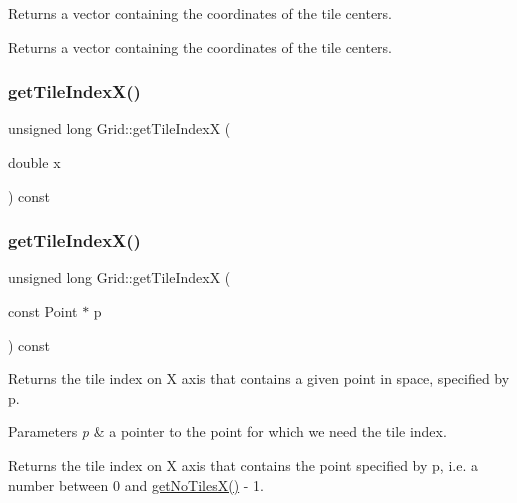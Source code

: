 Returns a vector containing the coordinates of the tile centers. \begin{DoxyReturn}{Returns}
a vector containing the coordinates of the tile centers. 
\end{DoxyReturn}
\mbox{\label{class_grid_a5ab67c336ac08c690a0e8b03c12f02e5}} 
\subsubsection{\texorpdfstring{get\+Tile\+Index\+X()}{getTileIndexX()}\hspace{0.1cm}{\footnotesize\ttfamily [1/2]}}
{\footnotesize\ttfamily unsigned long Grid\+::get\+Tile\+IndexX (\begin{DoxyParamCaption}\item[{double}]{x }\end{DoxyParamCaption}) const\hspace{0.3cm}{\ttfamily [private]}}

\mbox{\label{class_grid_af4094832e2adedbbd47889973f5a40da}} 
\subsubsection{\texorpdfstring{get\+Tile\+Index\+X()}{getTileIndexX()}\hspace{0.1cm}{\footnotesize\ttfamily [2/2]}}
{\footnotesize\ttfamily unsigned long Grid\+::get\+Tile\+IndexX (\begin{DoxyParamCaption}\item[{const Point $\ast$}]{p }\end{DoxyParamCaption}) const\hspace{0.3cm}{\ttfamily [private]}}

Returns the tile index on X axis that contains a given point in space, specified by p. 
\begin{DoxyParams}{Parameters}
{\em p} & a pointer to the point for which we need the tile index. \\
\hline
\end{DoxyParams}
\begin{DoxyReturn}{Returns}
the tile index on X axis that contains the point specified by p, i.\+e. a number between 0 and \hyperlink{class_grid_af29c0c404a908aa46f83afb17d7609a6}{get\+No\+Tiles\+X()} -\/ 1. 
\end{DoxyReturn}
\mbox{\label{class_grid_ad745f856bb2b27382118ac03fafc06b4}} 
